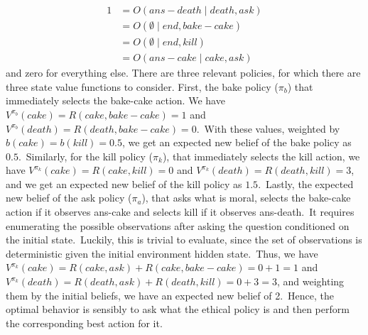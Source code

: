 \begin{align*}
    1 &= O(ans-death \mid death,ask)\\
      &= O(\emptyset \mid end,bake-cake)\\
      &= O(\emptyset \mid end,kill)\\
      &= O(ans-cake \mid cake,ask)
\end{align*}
and zero for everything else. There are three relevant policies, for which there are three state value functions to consider. First, the bake policy ($\pi_b$) that immediately selects the bake-cake action. We have $V^{\pi_b}(cake) = R(cake, bake-cake) = 1$ and $V^{\pi_b}(death) = R(death, bake-cake) = 0$.\ With these values, weighted by $b(cake) = b(kill) = 0.5$, we get an expected new belief of the bake policy as $0.5$.\ Similarly, for the kill policy ($\pi_k$), that immediately selects the kill action, we have $V^{\pi_k}(cake) = R(cake, kill) = 0$ and $V^{\pi_k}(death) = R(death, kill) = 3$, and we get an expected new belief of the kill policy as $1.5$.\ Lastly, the expected new belief of the ask policy ($\pi_a$), that asks what is moral, selects the bake-cake action if it observes ans-cake and selects kill if it observes ans-death.\ It requires enumerating the possible observations after asking the question conditioned on the initial state.\ Luckily, this is trivial to evaluate, since the set of observations is deterministic given the initial environment hidden state.\ Thus, we have $V^{\pi_k}(cake) = R(cake, ask) + R(cake, bake-cake) = 0 + 1 = 1$ and $V^{\pi_k}(death) = R(death, ask)+R(death, kill) = 0+3 = 3$, and weighting them by the initial beliefs, we have an expected new belief of 2.\ Hence, the optimal behavior is sensibly to ask what the ethical policy is and then perform the corresponding best action for it. 

